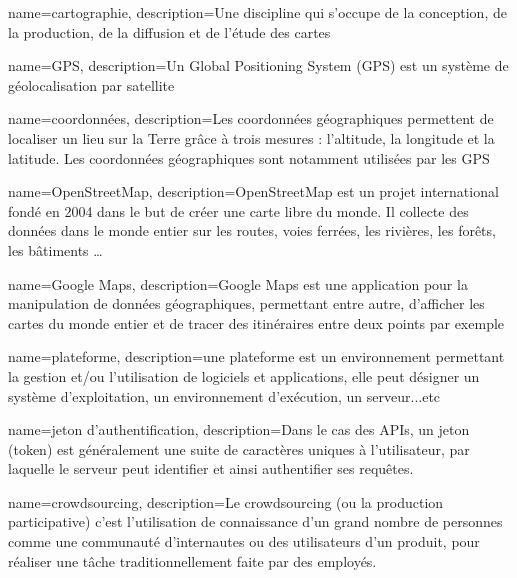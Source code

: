\makeglossaries


{
    name=cartographie,
    description={Une discipline qui s'occupe de la conception, de la production, de la diffusion et de l'étude des cartes}
}
 
{
    name=GPS,
    description={Un Global Positioning System (GPS) est un système de géolocalisation par satellite}
}

{
    name=coordonnées,
    description={Les coordonnées géographiques permettent de localiser un lieu sur la Terre grâce à trois mesures : l'altitude, la longitude et la latitude. Les coordonnées géographiques sont notamment utilisées par les GPS}
}

{
    name=OpenStreetMap,
    description={OpenStreetMap est un projet international fondé en 2004 dans le but de créer une carte libre du monde. Il collecte des données dans le monde entier sur les routes, voies ferrées, les rivières, les forêts, les bâtiments …}
}

{
    name=Google Maps,
    description={Google Maps est une application pour la manipulation de données géographiques, permettant entre autre, d'afficher les cartes du monde entier et de tracer des itinéraires entre deux points par exemple}
}

{
    name=plateforme,
    description={une plateforme est un environnement permettant la gestion et/ou l'utilisation de logiciels et applications, elle peut désigner un système d'exploitation, un environnement d'exécution, un serveur...etc}
}

{
    name=jeton d'authentification,
    description={Dans le cas des APIs, un jeton (token) est généralement une suite de caractères uniques à l'utilisateur, par laquelle le serveur peut identifier et ainsi authentifier ses requêtes.}
}

{
	name=crowdsourcing,
	description={Le crowdsourcing (ou la production participative) c'est l'utilisation de connaissance d'un grand nombre de personnes comme une communauté d'internautes ou des utilisateurs d'un produit, pour réaliser une tâche traditionnellement faite par des employés.}
}

